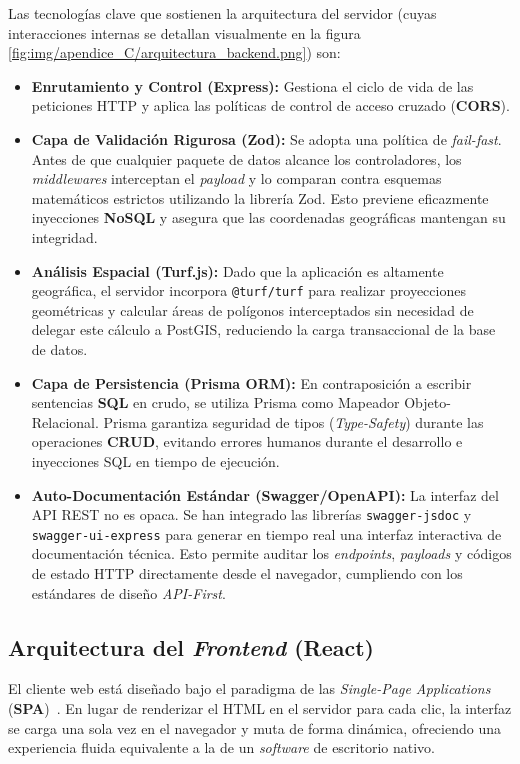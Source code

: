 Las tecnologías clave que sostienen la arquitectura del servidor (cuyas interacciones internas se detallan visualmente en la figura \ref{fig:img/apendice_C/arquitectura_backend.png}) son:
\begin{itemize}
    \item \textbf{Enrutamiento y Control (Express):} Gestiona el ciclo de vida de las peticiones HTTP y aplica las políticas de control de acceso cruzado (\textbf{CORS}).
    \item \textbf{Capa de Validación Rigurosa (Zod):} Se adopta una política de \textit{fail-fast}. Antes de que cualquier paquete de datos alcance los controladores, los \textit{middlewares} interceptan el \textit{payload} y lo comparan contra esquemas matemáticos estrictos utilizando la librería Zod. Esto previene eficazmente inyecciones \textbf{NoSQL} y asegura que las coordenadas geográficas mantengan su integridad.
    \item \textbf{Análisis Espacial (Turf.js):} Dado que la aplicación es altamente geográfica, el servidor incorpora \texttt{@turf/turf} para realizar proyecciones geométricas y calcular áreas de polígonos interceptados sin necesidad de delegar este cálculo a PostGIS, reduciendo la carga transaccional de la base de datos.
    \item \textbf{Capa de Persistencia (Prisma ORM):} En contraposición a escribir sentencias \textbf{SQL} en crudo, se utiliza Prisma como Mapeador Objeto-Relacional. Prisma garantiza seguridad de tipos (\textit{Type-Safety}) durante las operaciones \textbf{CRUD}, evitando errores humanos durante el desarrollo e inyecciones SQL en tiempo de ejecución.
    \item \textbf{Auto-Documentación Estándar (Swagger/OpenAPI):} La interfaz del API REST no es opaca. Se han integrado las librerías \texttt{swagger-jsdoc} y \texttt{swagger-ui-express} para generar en tiempo real una interfaz interactiva de documentación técnica. Esto permite auditar los \textit{endpoints}, \textit{payloads} y códigos de estado HTTP directamente desde el navegador, cumpliendo con los estándares de diseño \textit{API-First}.
\end{itemize}


\subsection{Arquitectura del \textit{Frontend} (React)}
El cliente web está diseñado bajo el paradigma de las \textit{Single-Page Applications} (\textbf{SPA})~\cite{spa}. En lugar de renderizar el HTML en el servidor para cada clic, la interfaz se carga una sola vez en el navegador y muta de forma dinámica, ofreciendo una experiencia fluida equivalente a la de un \textit{software} de escritorio nativo. 

